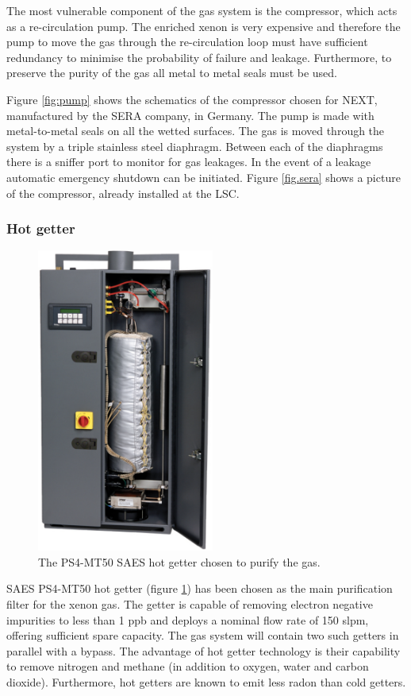 The most vulnerable component of the gas system is the compressor, which acts as a re-circulation pump. The enriched xenon is very expensive and therefore the pump to move the gas through the re-circulation loop must have sufficient redundancy to minimise the probability of failure and leakage. Furthermore, to preserve the purity of the gas all metal to metal seals must be used. 

Figure \ref{fig:pump} shows the schematics of the compressor chosen for NEXT, manufactured by the SERA company, in Germany. The pump is made with metal-to-metal seals on all the wetted surfaces. The gas is moved through the system by a triple stainless steel diaphragm. Between each of the diaphragms there is a sniffer port to monitor for gas leakages. In the event of a leakage automatic emergency shutdown can be initiated. Figure \ref{fig.sera} shows a picture of the compressor, already installed at the LSC. 

\subsubsection*{Hot getter}

\begin{figure}[hpt!]
\centering
\includegraphics[height=10cm]{img/Getter.pdf}
\caption{The PS4-MT50 SAES hot getter chosen to purify the gas.} \label{fig:getter}
\end{figure}

SAES PS4-MT50 hot getter (figure \ref{fig:getter}) has been chosen as the main purification filter for the xenon gas. The getter is capable of removing electron negative impurities to less than 1 ppb and deploys a nominal flow rate of 150 slpm, offering sufficient spare capacity. The gas system will contain two such getters in parallel with a bypass. The advantage of hot getter technology
is their capability to remove nitrogen and methane (in addition to oxygen, water and carbon dioxide). Furthermore, hot getters are known to emit less radon than cold getters.  

